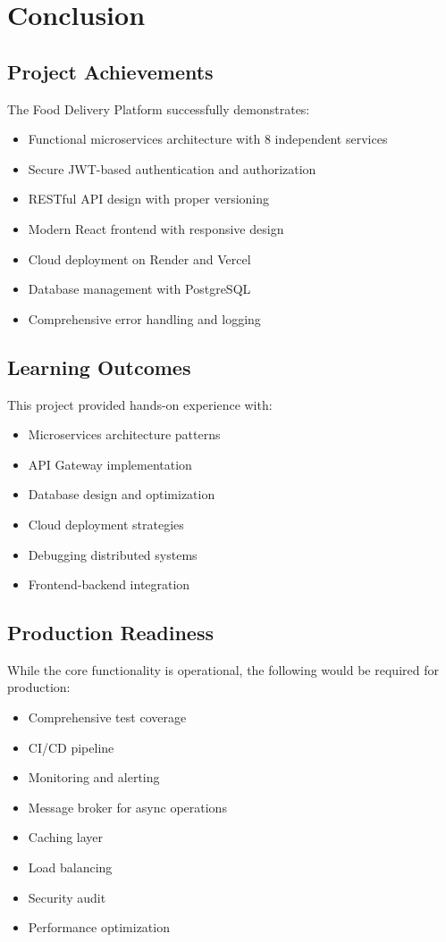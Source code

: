 \documentclass[12pt,a4paper]{article}
\begin{document}
\section{Conclusion}

\subsection{Project Achievements}

The Food Delivery Platform successfully demonstrates:
\begin{itemize}
    \item Functional microservices architecture with 8 independent services
    \item Secure JWT-based authentication and authorization
    \item RESTful API design with proper versioning
    \item Modern React frontend with responsive design
    \item Cloud deployment on Render and Vercel
    \item Database management with PostgreSQL
    \item Comprehensive error handling and logging
\end{itemize}

\subsection{Learning Outcomes}

This project provided hands-on experience with:
\begin{itemize}
    \item Microservices architecture patterns
    \item API Gateway implementation
    \item Database design and optimization
    \item Cloud deployment strategies
    \item Debugging distributed systems
    \item Frontend-backend integration
\end{itemize}

\subsection{Production Readiness}

While the core functionality is operational, the following would be required for production:
\begin{itemize}
    \item Comprehensive test coverage
    \item CI/CD pipeline
    \item Monitoring and alerting
    \item Message broker for async operations
    \item Caching layer
    \item Load balancing
    \item Security audit
    \item Performance optimization
\end{itemize}
\end{document}
